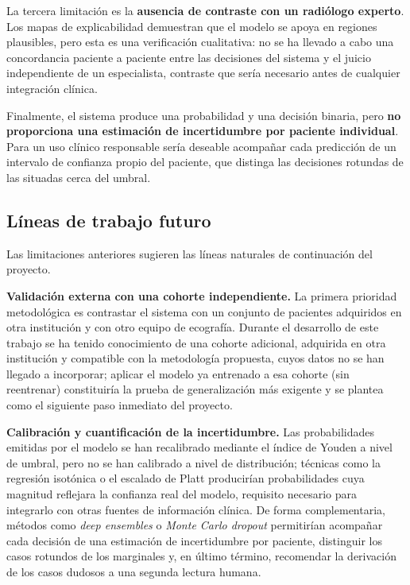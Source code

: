\documentclass[12pt]{extarticle}
\numberwithin{equation}{section}
\begin{document}
\begin{refsection}
La tercera limitación es la \textbf{ausencia de contraste con un radiólogo experto}. Los mapas de explicabilidad demuestran que el modelo se apoya en regiones plausibles, pero esta es una verificación cualitativa: no se ha llevado a cabo una concordancia paciente a paciente entre las decisiones del sistema y el juicio independiente de un especialista, contraste que sería necesario antes de cualquier integración clínica.

Finalmente, el sistema produce una probabilidad y una decisión binaria, pero \textbf{no proporciona una estimación de incertidumbre por paciente individual}. Para un uso clínico responsable sería deseable acompañar cada predicción de un intervalo de confianza propio del paciente, que distinga las decisiones rotundas de las situadas cerca del umbral.

\subsection{Líneas de trabajo futuro}\label{subsec:conc-futuro}

Las limitaciones anteriores sugieren las líneas naturales de continuación del proyecto.

\textbf{Validación externa con una cohorte independiente.} La primera prioridad metodológica es contrastar el sistema con un conjunto de pacientes adquiridos en otra institución y con otro equipo de ecografía. Durante el desarrollo de este trabajo se ha tenido conocimiento de una cohorte adicional, adquirida en otra institución y compatible con la metodología propuesta, cuyos datos no se han llegado a incorporar; aplicar el modelo ya entrenado a esa cohorte (sin reentrenar) constituiría la prueba de generalización más exigente y se plantea como el siguiente paso inmediato del proyecto.

\textbf{Calibración y cuantificación de la incertidumbre.} Las probabilidades emitidas por el modelo se han recalibrado mediante el índice de Youden a nivel de umbral, pero no se han calibrado a nivel de distribución; técnicas como la regresión isotónica o el escalado de Platt producirían probabilidades cuya magnitud reflejara la confianza real del modelo, requisito necesario para integrarlo con otras fuentes de información clínica. De forma complementaria, métodos como \textit{deep ensembles} o \textit{Monte Carlo dropout} permitirían acompañar cada decisión de una estimación de incertidumbre por paciente, distinguir los casos rotundos de los marginales y, en último término, recomendar la derivación de los casos dudosos a una segunda lectura humana.


\end{refsection}
\end{document}
